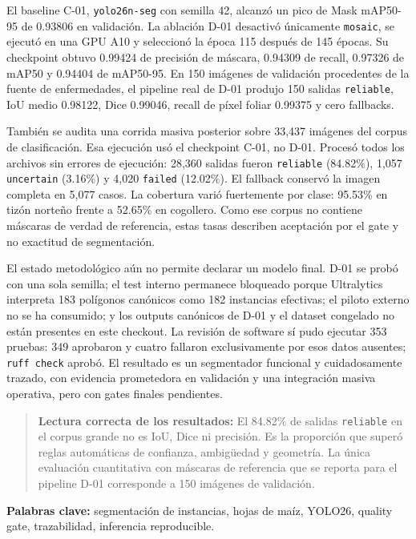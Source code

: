 \documentclass[11pt,a4paper]{article}
\begin{document}
El baseline C-01, \texttt{yolo26n-seg} con semilla 42, alcanzó un pico de Mask mAP50-95 de 0.93806 en validación. La ablación D-01 desactivó únicamente \texttt{mosaic}, se ejecutó en una GPU A10 y seleccionó la época 115 después de 145 épocas. Su checkpoint obtuvo 0.99424 de precisión de máscara, 0.94309 de recall, 0.97326 de mAP50 y 0.94404 de mAP50-95. En 150 imágenes de validación procedentes de la fuente de enfermedades, el pipeline real de D-01 produjo 150 salidas \texttt{reliable}, IoU medio 0.98122, Dice 0.99046, recall de píxel foliar 0.99375 y cero fallbacks.


También se audita una corrida masiva posterior sobre 33,437 imágenes del corpus de clasificación. Esa ejecución usó el checkpoint C-01, no D-01. Procesó todos los archivos sin errores de ejecución: 28,360 salidas fueron \texttt{reliable} (84.82\%), 1,057 \texttt{uncertain} (3.16\%) y 4,020 \texttt{failed} (12.02\%). El fallback conservó la imagen completa en 5,077 casos. La cobertura varió fuertemente por clase: 95.53\% en tizón norteño frente a 52.65\% en cogollero. Como ese corpus no contiene máscaras de verdad de referencia, estas tasas describen aceptación por el gate y no exactitud de segmentación.


El estado metodológico aún no permite declarar un modelo final. D-01 se probó con una sola semilla; el test interno permanece bloqueado porque Ultralytics interpreta 183 polígonos canónicos como 182 instancias efectivas; el piloto externo no se ha consumido; y los outputs canónicos de D-01 y el dataset congelado no están presentes en este checkout. La revisión de software sí pudo ejecutar 353 pruebas: 349 aprobaron y cuatro fallaron exclusivamente por esos datos ausentes; \texttt{ruff check} aprobó. El resultado es un segmentador funcional y cuidadosamente trazado, con evidencia prometedora en validación y una integración masiva operativa, pero con gates finales pendientes.


\begin{quote}\textbf{Lectura correcta de los resultados:} El 84.82\% de salidas \texttt{reliable} en el corpus grande no es IoU, Dice ni precisión. Es la proporción que superó reglas automáticas de confianza, ambigüedad y geometría. La única evaluación cuantitativa con máscaras de referencia que se reporta para el pipeline D-01 corresponde a 150 imágenes de validación.\end{quote}

\noindent\textbf{Palabras clave:} segmentación de instancias, hojas de maíz, YOLO26, quality gate, trazabilidad, inferencia reproducible.
\end{document}
